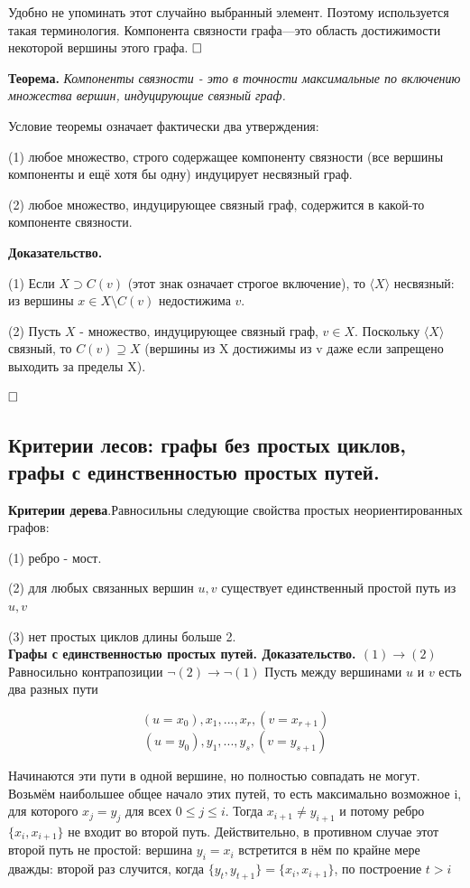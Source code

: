 \documentclass[a4paper, 10pt]{article}
\begin{document}
Удобно не упоминать этот случайно выбранный элемент. Поэтому используется такая терминология. Компонента связности графа—это область достижимости некоторой вершины этого графа. $\hfill \square$

\medskip

\textbf{Теорема.} \textit{Компоненты связности - это в точности  максимальные по включению множества вершин, индуцирующие связный граф.}

Условие теоремы означает фактически два утверждения:

(1) любое множество, строго содержащее компоненту связности (все вершины компоненты и ещё хотя бы одну) индуцирует несвязный граф.

(2) любое множество, индуцирующее связный граф, содержится в какой-то компоненте связности.

\textbf{Доказательство.}

(1) Если $X \supset C(v)$ (этот знак означает строгое включение), то $\langle X \rangle$ несвязный: из вершины $x \in X \setminus C(v)$ недостижима $v$.

(2) Пусть $X$ - множество, индуцирующее связный граф, $v \in X$. Поскольку $\langle X \rangle$ связный, то $C(v) \supseteq X$ (вершины из X достижимы из v даже если запрещено выходить за пределы X). 

$\hfill \square$


\subsection{Критерии лесов: графы без простых циклов, графы с единственностью простых путей.}

\textbf{Критерии дерева}.Равносильны следующие свойства простых неориентированных графов:

(1) ребро - мост.

(2) для любых связанных вершин $u, v$ существует единственный простой путь из $u, v$

(3) нет простых циклов длины больше 2. \\

\textbf{Графы с единственностью простых путей. Доказательство. $(1) \to (2)$} Равносильно контрапозиции $\neg(2) \to \neg(1)$ Пусть между вершинами $u$ и $v$ есть два разных пути

$$(u = x_0), x_1, ..., x_r, (v = x_{r + 1})$$
$$(u = y_0), y_1, ..., y_s, (v = y_{s + 1})$$

Начинаются эти пути в одной вершине, но полностью совпадать не могут. Возьмём наибольшее общее начало этих путей, то есть максимально возможное i, для которого $x_j = y_j$ для всех $0 \leqslant j \leqslant i$. Тогда $x_{i + 1} \neq y_{i + 1}$ и потому ребро $\{x_i,x_{i+1} \}$ не входит во второй путь. Действительно, в противном случае этот второй путь не простой: вершина $y_i = x_i$ встретится в нём по крайне мере дважды: второй раз случится, когда $\{y_t, y_{t + 1}\}= \{x_i, x_{i + 1}\}$, по построение $t > i$
\end{document}
